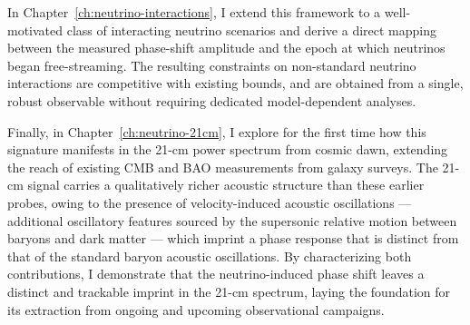 In Chapter~\ref{ch:neutrino-interactions}, I extend this framework to a well-motivated class of interacting neutrino scenarios and derive a direct mapping between the measured phase-shift amplitude and the epoch at which neutrinos began free-streaming. The resulting constraints on non-standard neutrino interactions are competitive with existing bounds, and are obtained from a single, robust observable without requiring dedicated model-dependent analyses.


Finally, in Chapter~\ref{ch:neutrino-21cm}, I explore for the first time how this signature manifests in the 21-cm power spectrum from cosmic dawn, extending the reach of existing CMB and BAO measurements from galaxy surveys. The 21-cm signal carries a qualitatively richer acoustic structure than these earlier probes, owing to the presence of velocity-induced acoustic oscillations --- additional oscillatory features sourced by the supersonic relative motion between baryons and dark matter --- which imprint a phase response that is distinct from that of the standard baryon acoustic oscillations. By characterizing both contributions, I demonstrate that the neutrino-induced phase shift leaves a distinct and trackable imprint in the 21-cm spectrum, laying the foundation for its extraction from ongoing and upcoming observational campaigns.
